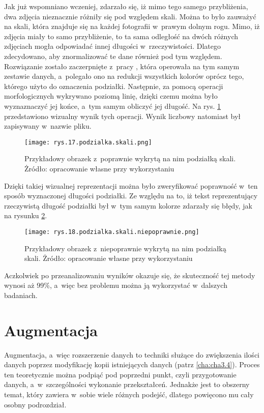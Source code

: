 Jak już wspomniano wczeniej, zdarzało się, iż mimo tego samego przybliżenia, dwa zdjęcia nieznacznie różniły się pod względem skali. Można to było zauważyć na skali, która znajduje się na każdej fotografii w~prawym dolnym rogu. Mimo, iż zdjęcia miały to samo przybliżenie, to ta sama odległość na dwóch różnych zdjęciach mogła odpowiadać innej długości w~rzeczywistości. Dlatego zdecydowano, aby znormalizować te dane również pod tym względem. Rozwiązanie zostało zaczerpnięte z~pracy \cite{Reczek21}, która operowała na tym samym zestawie danych, a~polegało ono na redukcji wszystkich kolorów oprócz tego, którego użyto do oznaczenia podziałki. Następnie, za pomocą operacji morfologicznych wykrywano poziomą linię, dzięki czemu można było wyznaznaczyć jej końce, a~tym samym obliczyć jej długość. Na rys. \ref{fig:mesh17} przedstawiono wizualny wynik tych operacji. Wynik liczbowy natomiast był zapisywany w~nazwie pliku. 
\begin{figure}[h]
    \centering
    \texttt{[image: rys.17.podzialka.skali.png]}
    \caption{Przykładowy obrazek z~poprawnie wykrytą na nim podziałką skali. Żródło: opracowanie własne przy wykorzystaniu \cite{Reczek21, Pirowski17}}
    \label{fig:mesh17}
\end{figure}
Dzięki takiej wizualnej reprezentacji można było zweryfikować poprawność w~ten sposób wyznaczonej długości podziałki. Ze względu na to, iż tekst reprezentujący rzeczywistą długość podziałki był w~tym samym kolorze zdarzały się błędy, jak na rysunku \ref{fig:mesh18}. 
\begin{figure}[h]
    \centering
    \texttt{[image: rys.18.podzialka.skali.niepoprawnie.png]}
    \caption{Przykładowy obrazek z~niepoprawnie wykrytą na nim podziałką skali. Żródło: opracowanie własne przy wykorzystaniu \cite{Reczek21, Pirowski17}}
    \label{fig:mesh18}
\end{figure}
Aczkolwiek po przeanalizowaniu wyników okazuje się, że skuteczność tej metody wynosi aż 99\%, a~więc bez problemu można ją wykorzystać w~dalszych badaniach.

\section{Augmentacja}
\label{sec:augmentacja}

Augmentacja, a~więc rozszerzenie danych to techniki służące do zwiększenia ilości danych poprzez modyfikację kopii istniejących danych (patrz \ref{cha:cha3.4}). Proces ten teoretycznie można podpiąć pod poprzedni punkt, czyli przygotowanie danych, a~w~szczególności wykonanie przekształceń. Jednakże jest to obszerny temat, który zawiera w~sobie wiele różnych podejść, dlatego powięcono mu cały osobny podrozdział. 

